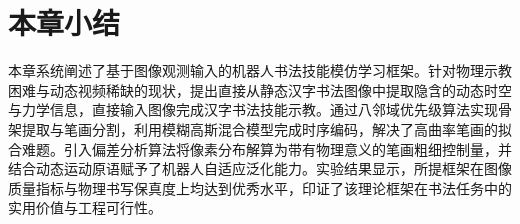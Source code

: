 \section{本章小结}
本章系统阐述了基于图像观测输入的机器人书法技能模仿学习框架。针对物理示教困难与动态视频稀缺的现状，提出直接从静态汉字书法图像中提取隐含的动态时空与力学信息，直接输入图像完成汉字书法技能示教。通过八邻域优先级算法实现骨架提取与笔画分割，利用模糊高斯混合模型完成时序编码，解决了高曲率笔画的拟合难题。引入偏差分析算法将像素分布解算为带有物理意义的笔画粗细控制量，并结合动态运动原语赋予了机器人自适应泛化能力。实验结果显示，所提框架在图像质量指标与物理书写保真度上均达到优秀水平，印证了该理论框架在书法任务中的实用价值与工程可行性。